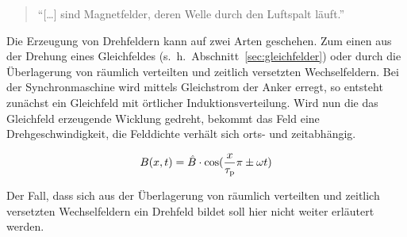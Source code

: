 \begin{quote}
\enquote{[\ldots] sind Magnetfelder, deren Welle durch den Luftspalt läuft.}
\end{quote}

Die Erzeugung von Drehfeldern kann auf zwei Arten geschehen.
Zum einen aus der Drehung eines Gleichfeldes (s.~h.~Abschnitt~\ref{sec:gleichfelder}) oder durch die Überlagerung von räumlich verteilten und zeitlich versetzten Wechselfeldern.
Bei der Synchronmaschine wird mittels Gleichstrom der Anker erregt, so entsteht zunächst ein Gleichfeld mit örtlicher Induktionsverteilung.
Wird nun die das Gleichfeld erzeugende Wicklung gedreht, bekommt das Feld eine Drehgeschwindigkeit, \dh die Felddichte verhält sich orts- und zeitabhängig.

\begin{align}
B(x,t) = \hat{B}\cdot\cos(\frac{x}{\tau_{\mathrm{p}}}\pi\pm\omega t)
\end{align}

Der Fall, dass sich aus der Überlagerung von räumlich verteilten und zeitlich versetzten Wechselfeldern ein Drehfeld bildet soll hier nicht weiter erläutert werden.




